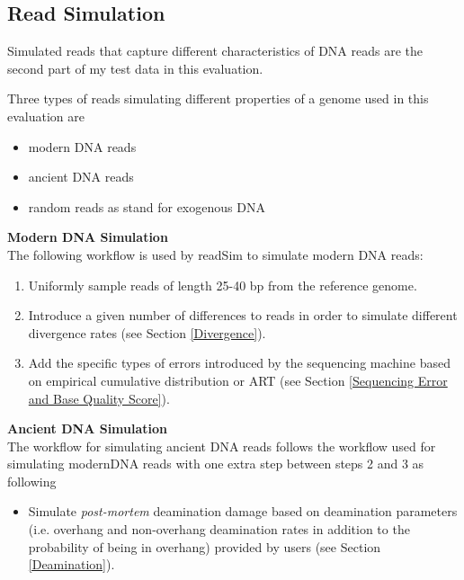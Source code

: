 \documentclass[11pt,a4paper]{report}
\begin{document}


\subsection{Read Simulation} \label{Read Simulation}

Simulated reads that capture different characteristics of DNA reads are the 
second part of my test data in this evaluation.

Three types of reads simulating different properties of a genome used in this
 evaluation are

\begin{itemize}
	\item modern DNA reads
	\item ancient DNA reads
	\item random reads as stand for exogenous DNA
\end{itemize}

\textbf{Modern DNA Simulation}\\

The following workflow is used by readSim to simulate modern DNA
 reads:

\begin{enumerate}
 \item Uniformly sample reads of length 25-40 bp from the reference genome.

 \item Introduce a given number of differences to 
 reads in order to simulate different divergence rates
 (see Section \ref{Divergence}).

 \item Add the specific types of errors introduced by the sequencing 
 machine based on empirical cumulative distribution or ART\cite{art} 
 (see Section \ref{Sequencing Error and Base Quality Score}).
\end{enumerate}


\textbf{Ancient DNA Simulation} \\

The workflow for simulating ancient DNA reads follows the workflow used for 
simulating modernDNA reads with one extra step between steps 2 and 3 as following

\begin{itemize}
 
\item Simulate \emph{post-mortem} deamination damage based on 
deamination parameters (i.e. overhang and non-overhang deamination 
rates in addition to the probability of being in overhang) provided by users
(see Section \ref{Deamination}). 

\end{itemize}
\end{document}
